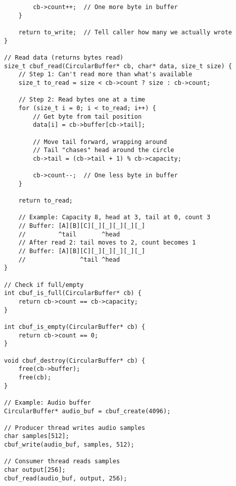 \begin{lstlisting}
        cb->count++;  // One more byte in buffer
    }

    return to_write;  // Tell caller how many we actually wrote
}

// Read data (returns bytes read)
size_t cbuf_read(CircularBuffer* cb, char* data, size_t size) {
    // Step 1: Can't read more than what's available
    size_t to_read = size < cb->count ? size : cb->count;

    // Step 2: Read bytes one at a time
    for (size_t i = 0; i < to_read; i++) {
        // Get byte from tail position
        data[i] = cb->buffer[cb->tail];

        // Move tail forward, wrapping around
        // Tail "chases" head around the circle
        cb->tail = (cb->tail + 1) % cb->capacity;

        cb->count--;  // One less byte in buffer
    }

    return to_read;

    // Example: Capacity 8, head at 3, tail at 0, count 3
    // Buffer: [A][B][C][_][_][_][_][_]
    //         ^tail       ^head
    // After read 2: tail moves to 2, count becomes 1
    // Buffer: [A][B][C][_][_][_][_][_]
    //               ^tail ^head
}

// Check if full/empty
int cbuf_is_full(CircularBuffer* cb) {
    return cb->count == cb->capacity;
}

int cbuf_is_empty(CircularBuffer* cb) {
    return cb->count == 0;
}

void cbuf_destroy(CircularBuffer* cb) {
    free(cb->buffer);
    free(cb);
}

// Example: Audio buffer
CircularBuffer* audio_buf = cbuf_create(4096);

// Producer thread writes audio samples
char samples[512];
cbuf_write(audio_buf, samples, 512);

// Consumer thread reads samples
char output[256];
cbuf_read(audio_buf, output, 256);
\end{lstlisting}

